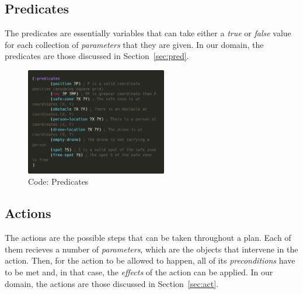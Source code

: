\documentclass{article}
\begin{document}
\subsection{Predicates}
The predicates are essentially variables that can take either a \textit{true} or \textit{false} value for each collection of \textit{parameters} that they are given. In our domain, the predicates are those discussed in Section~\ref{sec:pred}.
\begin{figure}[H]
    \centering
    \includegraphics[width=0.55\textwidth]{assets/solution_coordinates/predicates.png}
    \caption{Code: Predicates}
    \label{fig:pred}
\end{figure}

\subsection{Actions}
The actions are the possible steps that can be taken throughout a plan. Each of them recieves a number of \textit{parameters}, which are the objects that intervene in the action. Then, for the action to be allowed to happen, all of its \textit{preconditions} have to be met and, in that case, the \textit{effects} of the action can be applied. In our domain, the actions are those discussed in Section~\ref{sec:act}.
\end{document}
